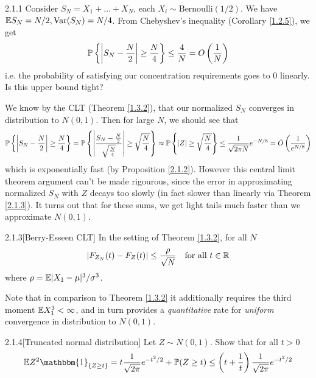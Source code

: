 \begin{eg}{2.1.1}
Consider $S_N = X_1 + ... + X_N$, each $X_i \sim \text{Bernoulli}(1/2)$. We have $\mathbb{E} S_N = N/2, \text{Var} (S_N) = N/4$. From Chebyshev's inequality (Corollary \ref{1.2.5}), we get
\begin{align*}
    \mathbb{P} \left\{ \left|S_N - \frac N 2\right| \geq \frac N 4 \right\} \leq \frac 4 N = O\left(\frac1N\right)
\end{align*}
i.e. the probability of satisfying our concentration requirements goes to 0 linearly. Is this upper bound tight?

We know by the CLT (Theorem \ref{1.3.2}), that our normalized $S_N$ converges in distribution to $N(0,1)$. Then for large $N$, we should see that
\begin{align*}
    \mathbb{P} \left\{ \left|S_N - \frac N 2\right| \geq \frac N 4\right\} = \mathbb{P} \left\{\left|\frac {S_N - \frac N 2}{\sqrt{\frac N 4}}\right| \geq \sqrt{\frac N 4} \right\} \approx \mathbb{P} \left\{ |Z| \geq \sqrt{\frac N 4} \right\} \leq \frac 1 {\sqrt{2 \pi N}}e^{-N/8} = \tilde{O}\left(\frac 1 {e^{N/8}}\right)
\end{align*}
which is exponentially fast (by Proposition \ref{2.1.2}). However this central limit theorem argument can't be made rigourous, since the error in approximating normalized $S_N$ with $Z$ decays too slowly (in fact slower than linearly via Theorem \ref{2.1.3}). It turns out that for these sums, we get light tails much faster than we approximate $N(0,1)$.

\end{eg}

\begin{thm}{2.1.3}[Berry-Esseen CLT]\label{2.1.3}
In the setting of Theorem \ref{1.3.2}, for all $N$
\begin{align*}
    |F_{Z_N}(t) - F_Z(t)| \leq  \frac \rho {\sqrt{N}} \quad\text{for all $t\in\mathbb{R}$}
\end{align*}
where $\rho = \mathbb{E} |X_1 - \mu|^3/\sigma^3$.
\end{thm}
Note that in comparison to Theorem \ref{1.3.2} it additionally requires the third moment $\mathbb{E} X_1^3 < \infty$, and in turn provides a \textit{quantitative} rate for \textit{uniform} convergence in distribution to $N(0,1)$.


\begin{ex}{2.1.4}[Truncated normal distribution]
Let $Z \sim N(0,1)$. Show that for all $t> 0$
\begin{align*}
    \E Z^2 \mathbbm{1}_{\{Z\geq t\}} = t \frac1{\sqrt{2\pi}}e^{-t^2/2} + \P(Z \geq t) \leq \l(t + \frac1t \r) \frac 1 {\sqrt{2\pi}} e^{-t^2/2}
\end{align*}
\end{ex}


